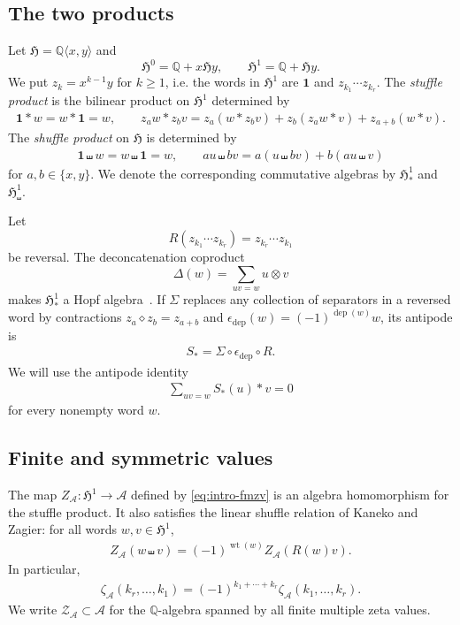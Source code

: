 \documentclass[12pt]{amsart}
\numberwithin{equation}{section}
\theoremstyle{plain}
\newcommand{\QQ}{\mathbb{Q}}
\DeclareMathOperator{\wt}{wt}
\DeclareMathOperator{\dep}{dep}
\newcommand{\h}{\mathfrak H}
\newcommand{\A}{\mathcal A}
\newcommand{\ZA}{{\mathcal Z_{\mathcal A}}}
\newcommand{\za}[1]{\zeta_{\mathcal A}(#1)}
\newcommand{\emptyword}{\mathbf 1}
\begin{document}
\subsection{The two products}

Let $\h=\QQ\langle x,y\rangle$ and
\[
 \h^0=\QQ+x\h y,
 \qquad
 \h^1=\QQ+\h y.
\]
We put $z_k=x^{k-1}y$ for $k\geq1$, i.e. the words in $\h^1$ are $\emptyword$ and $z_{k_1}\cdots z_{k_r}$. The \emph{stuffle product} is the bilinear product on $\h^1$ determined by
\begin{align}\label{eq:stuffle}
 \emptyword*w=w*\emptyword=w,
 \qquad
 z_aw*z_bv=z_a(w*z_bv)+z_b(z_aw*v)+z_{a+b}(w*v).
\end{align}
The \emph{shuffle product} on $\h$ is determined by
\begin{align}\label{eq:shuffle}
 \emptyword\shuffle w=w\shuffle\emptyword=w,
 \qquad
 au\shuffle bv=a(u\shuffle bv)+b(au\shuffle v)
\end{align}
for $a,b\in\{x,y\}$. We denote the corresponding commutative algebras by $\h^1_*$ and $\h^1_\shuffle$.

Let
\[
 R(z_{k_1}\cdots z_{k_r})=z_{k_r}\cdots z_{k_1}
\]
be reversal. The deconcatenation coproduct
\[
 \Delta(w)=\sum_{uv=w}u\otimes v
\]
makes $\h^1_*$ a Hopf algebra~\cite{HoffmanIhara}. If $\Sigma$ replaces any collection of separators in a reversed word by contractions $z_a\diamond z_b=z_{a+b}$ and $\epsilon_{\dep}(w)=(-1)^{\dep(w)}w$, its antipode is
\begin{align}\label{eq:antipode}
 S_*=\Sigma\circ\epsilon_{\dep}\circ R.
\end{align}
We will use the antipode identity
\begin{align}\label{eq:antipode-identity}
 \sum_{uv=w}S_*(u)*v=0
\end{align}
for every nonempty word $w$.

\subsection{Finite and symmetric values}

The map $Z_{\mathcal A}:\h^1\to\A$ defined by \eqref{eq:intro-fmzv} is an algebra homomorphism for the stuffle product. It also satisfies the linear shuffle relation of Kaneko and Zagier: for all words $w,v\in\h^1$,
\begin{align}\label{eq:finite-linear-shuffle}
 Z_{\mathcal A}(w\shuffle v)=(-1)^{\wt(w)}Z_{\mathcal A}(R(w)v).
\end{align}
In particular,
\begin{align}\label{eq:finite-reversal}
 \za{k_r,\ldots,k_1}=(-1)^{k_1+\cdots+k_r}\za{k_1,\ldots,k_r}.
\end{align}
We write $\ZA\subset\A$ for the $\QQ$-algebra spanned by all finite multiple zeta values.
\end{document}

